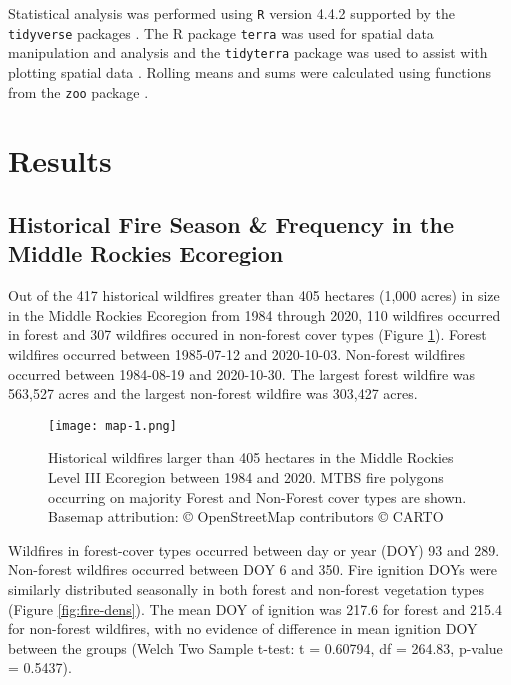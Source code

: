 \documentclass[11p]{article}
\begin{document}
Statistical analysis was performed using \texttt{R} version 4.4.2 \citep{rcoreteamLanguageEnvironmentStatistical2024} supported by the \texttt{tidyverse} packages \citep{hernangomezUsingTidyverseTerra2023} .  The R package \texttt{terra} was used for spatial data manipulation and analysis \citep{hijmansTerraSpatialData2024} and the \texttt{tidyterra} package was used to assist with plotting spatial data \citep{hernangomezUsingTidyverseTerra2023}.  Rolling means and sums were calculated using functions from the \texttt{zoo} package \citep{zeileisZooS3Infrastructure2005}.  

\section{Results}

\subsection{Historical Fire Season \& Frequency in the Middle Rockies Ecoregion}

Out of the 417 historical wildfires greater than 405 hectares (1,000 acres) in size in the Middle Rockies Ecoregion from 1984 through 2020, 110 wildfires occurred in forest and 307 wildfires occured in non-forest cover types (Figure \ref{fig:map}).  Forest wildfires occurred between 1985-07-12 and 2020-10-03.  Non-forest wildfires occurred between 1984-08-19 and 2020-10-30.  The largest forest wildfire was 563,527 acres and the largest non-forest wildfire was 303,427 acres.

\begin{figure}[htbp]
  \texttt{[image: map-1.png]}
  \caption{Historical wildfires larger than 405 hectares in the Middle Rockies Level III Ecoregion between 1984 and 2020. MTBS fire polygons occurring on majority Forest and Non-Forest cover types are shown.  Basemap attribution: © OpenStreetMap contributors © CARTO}
  \label{fig:map}
\end{figure}

Wildfires in forest-cover types occurred between day or year (DOY) 93 and 289.  Non-forest wildfires occurred between DOY 6 and 350.  Fire ignition DOYs were similarly distributed seasonally in both forest and non-forest vegetation types (Figure \ref{fig:fire-dens}). The mean DOY of ignition was 217.6 for forest and 215.4 for non-forest wildfires, with no evidence of difference in mean ignition DOY between the groups (Welch Two Sample t-test: t = 0.60794, df = 264.83, p-value = 0.5437).
\end{document}
